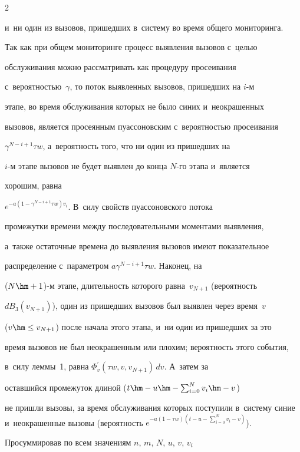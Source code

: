 \begin{multicols}{2}
\begin{enumerate}
и~ни один из вызовов, пришедших в~систему во время общего мониторинга. 


Так как при общем мониторинге процесс выявления вызовов с~\mbox{целью} 


обслуживания можно рассматривать как процедуру просеивания 


с~вероятностью~$\gamma$, то поток выявленных вызовов, пришедших на \mbox{$i$-м} 


этапе, во время обслуживания которых не было синих и~неокрашенных 


вызовов, является просеянным пуассоновским с~вероятностью просеивания 


$\gamma^{N-i+1} \tau w$, а~вероятность того, что ни один из пришедших на 


$i$-м этапе вызовов не будет выявлен до конца $N$-го этапа и~является 


хорошим, равна 


 $e^{-a(1-\gamma^{N-i+1}\tau w)v_i}$. В~силу свойств пуассоновского потока 


промежутки вре\-ме\-ни между последовательными моментами выявления, 


а~также остаточные времена до выявления вызовов имеют показательное 


распределение с~параметром $a\gamma^{N-i+1}\tau w$. Наконец, на 


($N\hm+1$)-м этапе, длительность которого равна~$v_{N+1}$ (вероятность 


$dB_3(v_{N+1})$), один из пришедших вызовов был выявлен через время~$v$ 


($v\hm\leq v_{N+1}$) после начала этого этапа, и~ни один из пришедших за это 


время вызовов не был неокрашенным или плохим; вероятность этого события, 


в~силу леммы~1, равна $\Phi^\prime_v(\tau w, v, v_{N+1})\,dv$. А~затем за 


оставшийся промежуток длиной ($t\hm-u\hm-\sum\nolimits^N_{i=0} v_i\hm- v$) 


не пришли вызовы, за время обслуживания которых поступили в~систему синие и~неокрашенные вызовы (вероятность $e^{-a(1-\tau w) (t -u-


\sum\nolimits^N_{i=0} v_i-v)}$).\\[-13pt]


\end{enumerate}


  


  Просуммировав по всем значениям $n$, $m$, $N$, $u$, ${v}$, $v_i$ 



\end{multicols}
